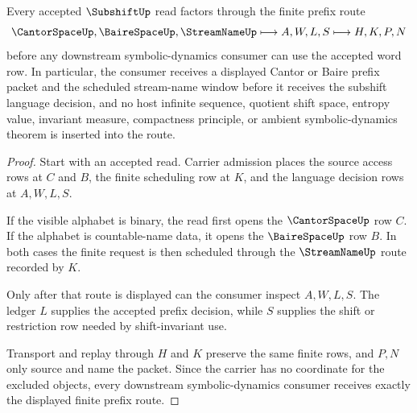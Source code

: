 \begin{theorem}
\label{thm:subshift-cantor-baire-handoff}
Every accepted $\SubshiftUp$ read factors through the finite prefix route
$$
\CantorSpaceUp,\BaireSpaceUp,\StreamNameUp \longmapsto A,W,L,S \longmapsto H,K,P,N
$$
before any downstream symbolic-dynamics consumer can use the accepted word row. In particular, the consumer receives a displayed Cantor or Baire prefix packet and the scheduled stream-name window before it receives the subshift language decision, and no host infinite sequence, quotient shift space, entropy value, invariant measure, compactness principle, or ambient symbolic-dynamics theorem is inserted into the route.
\end{theorem}
\begin{proof}
Start with an accepted read. Carrier admission places the source access rows at $C$ and $B$, the finite scheduling row at $K$, and the language decision rows at $A,W,L,S$.

If the visible alphabet is binary, the read first opens the $\CantorSpaceUp$ row $C$. If the alphabet is countable-name data, it opens the $\BaireSpaceUp$ row $B$. In both cases the finite request is then scheduled through the $\StreamNameUp$ route recorded by $K$.

Only after that route is displayed can the consumer inspect $A,W,L,S$. The ledger $L$ supplies the accepted prefix decision, while $S$ supplies the shift or restriction row needed by shift-invariant use.

Transport and replay through $H$ and $K$ preserve the same finite rows, and $P,N$ only source and name the packet. Since the carrier has no coordinate for the excluded objects, every downstream symbolic-dynamics consumer receives exactly the displayed finite prefix route.
\end{proof}


\begin{closurestatus}{\SubshiftUp}
  \theoryclosure{\seedClosure}
  \formalstatus{\unformalizedV}
\end{closurestatus}

